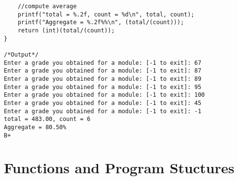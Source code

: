 \documentclass[10pt, a4paper, twocolumn]{article} %
\begin{document}
\begin{lstlisting}
    //compute average
    printf("total = %.2f, count = %d\n", total, count);
    printf("Aggregate = %.2f%%\n", (total/(count)));
    return (int)(total/(count));
}

/*Output*/
Enter a grade you obtained for a module: [-1 to exit]: 67
Enter a grade you obtained for a module: [-1 to exit]: 87
Enter a grade you obtained for a module: [-1 to exit]: 89
Enter a grade you obtained for a module: [-1 to exit]: 95
Enter a grade you obtained for a module: [-1 to exit]: 100
Enter a grade you obtained for a module: [-1 to exit]: 45
Enter a grade you obtained for a module: [-1 to exit]: -1
total = 483.00, count = 6
Aggregate = 80.50%
B+
\end{lstlisting}

\section{Functions and Program Stuctures}


\printbibliography[title={Bibliography}] %

\end{document}
